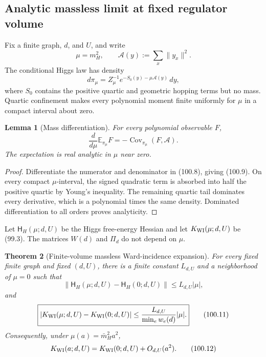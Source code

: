 \documentclass[11pt]{article}
\newtheorem{theorem}{Theorem}[section]
\newtheorem{lemma}[theorem]{Lemma}
\theoremstyle{remark}
\begin{document}
\subsection{Analytic massless limit at fixed regulator volume}

Fix a finite graph, \(d\), and \(U\), and write
\[
 \mu=m_H^2,
 \qquad
 \mathcal A(y):=\sum_x\|y_x\|^2.                   \tag{100.7}
\]
The conditional Higgs law has density
\[
 d\pi_\mu=Z_\mu^{-1}
 e^{-S_0(y)-\mu\mathcal A(y)}\,dy,                  \tag{100.8}
\]
where \(S_0\) contains the positive quartic and geometric hopping
terms but no mass.  Quartic confinement makes every polynomial moment
finite uniformly for \(\mu\) in a compact interval about zero.

\begin{lemma}[Mass differentiation]
\label{lem:v17v100-mass-derivative}
For every polynomial observable \(F\),
\[
\boxed{
 \frac d{d\mu}\mathbb E_{\pi_\mu}F
 =-\operatorname{Cov}_{\pi_\mu}(F,\mathcal A).}     \tag{100.9}
\]
The expectation is real analytic in \(\mu\) near zero.
\end{lemma}

\begin{proof}
Differentiate the numerator and denominator in (100.8), giving
(100.9).  On every compact \(\mu\)-interval, the signed quadratic term
is absorbed into half the positive quartic by Young's inequality.
The remaining quartic tail dominates every derivative, which is a
polynomial times the same density.  Dominated differentiation to all
orders proves analyticity.
\end{proof}

Let \(\mathsf H_H(\mu;d,U)\) be the Higgs free-energy Hessian and let
\(K_{\rm WI}(\mu;d,U)\) be (99.3).  The matrices \(W(d)\) and
\(\Pi_d\) do not depend on \(\mu\).

\begin{theorem}[Finite-volume massless Ward-incidence expansion]
\label{thm:v17v100-massless-expansion}
For every fixed finite graph and fixed \((d,U)\), there is a finite
constant \(L_{d,U}\) and a neighborhood of \(\mu=0\) such that
\[
 \|\mathsf H_H(\mu;d,U)-\mathsf H_H(0;d,U)\|
 \leq L_{d,U}|\mu|,                                 \tag{100.10}
\]
and
\[
\boxed{
 |K_{\rm WI}(\mu;d,U)-K_{\rm WI}(0;d,U)|
 \leq\frac{L_{d,U}}{\min_ew_e(d)}|\mu|.}           \tag{100.11}
\]
Consequently, under \(\mu(a)=\bar m_H^2a^2\),
\[
 K_{\rm WI}(a;d,U)
 =K_{\rm WI}(0;d,U)+O_{d,U}(a^2).                  \tag{100.12}
\]
\end{theorem}
\end{document}
